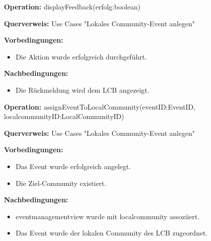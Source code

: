 \documentclass[a4paper,12pt]{article}
\begin{document}
	\begin{contractbox}
		\textbf{Operation:} displayFeedback(erfolg:boolean)
		
		\textbf{Querverweis:} Use Cases "Lokales Community-Event anlegen"
		
		\textbf{Vorbedingungen:}
		\begin{itemize}[noitemsep]
			\item Die Aktion wurde erfolgreich durchgeführt.
		\end{itemize}
		
		\textbf{Nachbedingungen:}
		\begin{itemize}[noitemsep]
			\item Die Rückmeldung wird dem LCB angezeigt.
		\end{itemize}
	\end{contractbox}
	
	
	\begin{contractbox}
		\textbf{Operation:} assignEventToLocalCommunity(eventID:EventID, localcommunityID:LocalCommunityID)
		
		\textbf{Querverweis:} Use Cases "Lokales Community-Event anlegen"
		
		\textbf{Vorbedingungen:}
		\begin{itemize}[noitemsep]
			\item Das Event wurde erfolgreich angelegt.
			\item Die Ziel-Community existiert.
		\end{itemize}
		
		\textbf{Nachbedingungen:}
		\begin{itemize}[noitemsep]
			\item eventmanagementview wurde mit localcommunity assoziiert.
			\item Das Event wurde der lokalen Community des LCB zugeordnet.
		\end{itemize}
	\end{contractbox}
	
\end{document}
